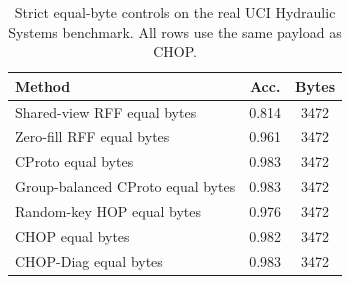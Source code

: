 \begin{table}[t]
\centering
\caption{Strict equal-byte controls on the real UCI Hydraulic Systems benchmark. All rows use the same payload as CHOP.}
\label{tab:strict-equal-byte-hydraulic}
\begin{tabular}{lcc}
\toprule
Method & Acc. & Bytes \\
\midrule
Shared-view RFF equal bytes & 0.814 & 3472 \\
Zero-fill RFF equal bytes & 0.961 & 3472 \\
CProto equal bytes & 0.983 & 3472 \\
Group-balanced CProto equal bytes & 0.983 & 3472 \\
Random-key HOP equal bytes & 0.976 & 3472 \\
CHOP equal bytes & 0.982 & 3472 \\
CHOP-Diag equal bytes & 0.983 & 3472 \\
\bottomrule
\end{tabular}
\end{table}
